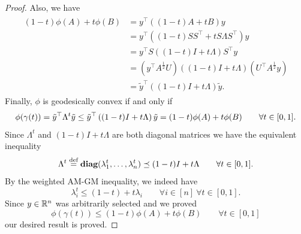 \documentclass[twoside,11pt]{article}
\begin{document}
\begin{proof}
Also, we have
\begin{align*}
    \begin{split}
        (1-t)\phi(A) + t \phi(B) & = y^\top \left((1-t)A + t B\right) y 
        \\ &= y^\top \left( (1-t)S S^\top + t S \Lambda S^\top \right)y 
        \\&= y^\top S \left((1-t)I + t \Lambda  \right)S^\top y
        \\&= \left(y^\top A^{\frac{1}{2}}U \right)\left((1-t)I + t \Lambda  \right) \left(U^\top A^{\frac{1}{2}}y \right)
        \\&= \tilde{y}^\top \left((1-t)I + t \Lambda\right) \tilde{y}.
    \end{split}
\end{align*}
Finally, $\phi$ is geodesically convex if and only if 
\[
\phi(\gamma(t)) = \Tilde{y}^\top \Lambda^t \Tilde{y} \leq \tilde{y}^\top \left((1-t)I + t \Lambda\right) \tilde{y} = (1-t)\phi(A) + t \phi(B) \qquad \forall t \in [0,1].
\]
Since $\Lambda^t$ and $(1-t)I + t \Lambda$ are both diagonal matrices we have the equivalent inequality
\[
\Lambda^t \stackrel{\text{def}}{=} \textbf{diag}(\lambda_1^t, \ldots, \lambda_n^t) \preceq (1-t)I + t \Lambda \qquad \forall t \in [0,1].
\]
By the weighted AM-GM inequality, we indeed have 
\[
\lambda_i^t \leq (1-t) + t \lambda_i \qquad \forall i \in [n] \ \forall t \in [0,1]. 
\]
Since $y \in \mathbb{R}^n$ was arbitrarily selected and we proved 
\[
\phi(\gamma(t)) \leq (1-t)\phi(A) + t \phi(B) \qquad \forall t \in [0,1]
\]
our desired result is proved.
\end{proof}
\[\]
\end{document}
